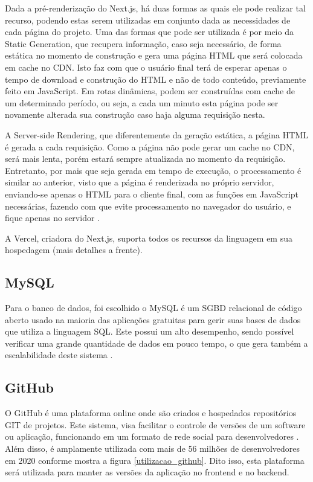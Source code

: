 Dada a pré-renderização do Next.js, há duas formas as quais ele pode realizar tal recurso, podendo estas serem utilizadas em conjunto dada as necessidades de cada página do projeto. Uma das formas que pode ser utilizada é por meio da Static Generation, que recupera informação, caso seja necessário, de forma estática no momento de construção e gera uma página HTML que será colocada em cache no CDN. Isto faz com que o usuário final terá de esperar apenas o tempo de download e construção do HTML e não de todo conteúdo, previamente feito em JavaScript. Em rotas dinâmicas, podem ser construídas com cache de um determinado período, ou seja, a cada um minuto esta página pode ser novamente alterada sua construção caso haja alguma requisição nesta.

A Server-side Rendering, que diferentemente da geração estática, a página HTML é gerada a cada requisição. Como a página não pode gerar um cache no CDN, será mais lenta, porém estará sempre atualizada no momento da requisição. Entretanto, por mais que seja gerada em tempo de execução, o processamento é similar ao anterior, visto que a página é renderizada no próprio servidor, enviando-se apenas o HTML para o cliente final, com as funções em JavaScript necessárias, fazendo com que evite processamento no navegador do usuário, e fique apenas no servidor \cite{VERCEL}.

A Vercel, criadora do Next.js, suporta todos os recursos da linguagem em sua hospedagem (mais detalhes a frente).

\subsection{MySQL}
Para o banco de dados, foi escolhido o MySQL é um SGBD relacional de código aberto usado na maioria das aplicações gratuitas para gerir suas bases de dados que utiliza a linguagem SQL. Este possui um alto desempenho, sendo possível verificar uma grande quantidade de dados em pouco tempo, o que gera também a escalabilidade deste sistema \cite{HEUSER}.

\subsection{GitHub}
O GitHub é uma plataforma online onde são criados e hospedados repositórios GIT de projetos. Este sistema, visa facilitar o controle de versões de um software ou aplicação, funcionando em um formato de rede social para desenvolvedores \cite{SANTACROCE}. Além disso, é amplamente utilizada com mais de 56 milhões de desenvolvedores em 2020 conforme mostra a figura \ref{utilizacao_github}. Dito isso, esta plataforma será utilizada para manter as versões da aplicação no frontend e no backend.

